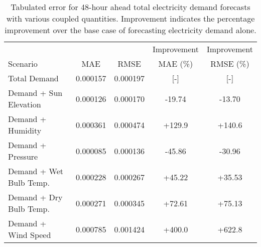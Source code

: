   \begin{table*}[t]
    \centering
    \caption{Tabulated error for 48-hour ahead total electricity demand forecasts with various coupled quantities. Improvement indicates the percentage improvement over the base case of forecasting electricity demand alone.}
    \label{tab:demand48}
    \begin{tabular}{l|c|c|c|c}
      &  & & Improvement & Improvement \\
      Scenario  & MAE & RMSE & MAE (\%) & RMSE (\%)\\
      \hline
      Total Demand & 0.000157 & 0.000197 & [-] & [-] \\
      Demand + Sun Elevation & 0.000126 & 0.000170 & -19.74 & -13.70\\
      Demand + Humidity & 0.000361 & 0.000474 & +129.9& +140.6\\
      Demand + Pressure & 0.000085 & 0.000136 & -45.86& -30.96\\
      Demand + Wet Bulb Temp. & 0.000228 & 0.000267 & +45.22& +35.53\\
      Demand + Dry Bulb Temp. & 0.000271 & 0.000345 & +72.61& +75.13\\
      Demand + Wind Speed & 0.000785 & 0.001424 & +400.0& +622.8\\
    \end{tabular}
  \end{table*}
